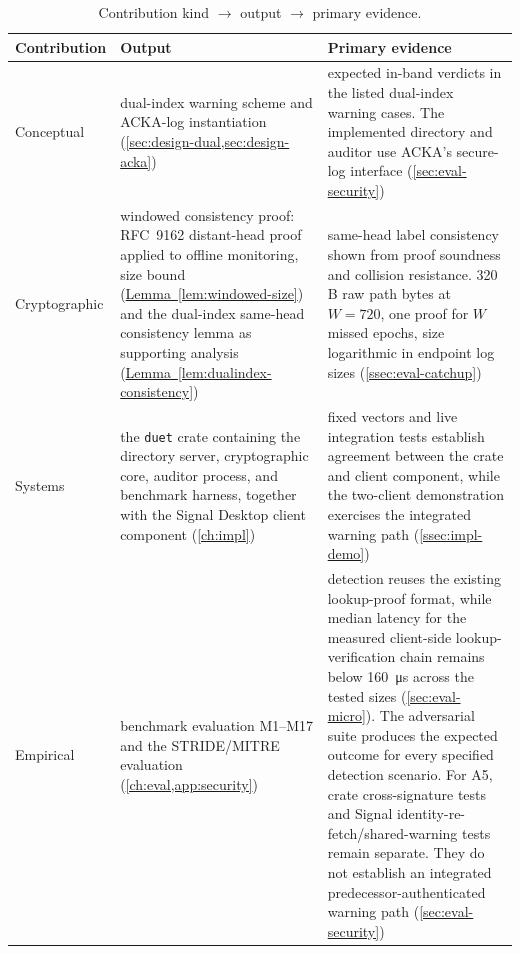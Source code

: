 \begin{table}[ht]
\centering
\caption{Contribution kind $\to$ output $\to$ primary evidence.}
\label{tab:trace-contrib}
\setlength{\extrarowheight}{2pt}
\footnotesize
\begin{tabularx}{\textwidth}{@{}>{\raggedright\arraybackslash}p{2.1cm}>{\raggedright\arraybackslash}X>{\raggedright\arraybackslash}X@{}}
\toprule
Contribution & Output & Primary evidence \\
\midrule
Conceptual & dual-index warning scheme and ACKA-log instantiation (\cref{sec:design-dual,sec:design-acka}) & expected in-band verdicts in the listed dual-index warning cases. The implemented directory and auditor use ACKA's secure-log interface (\cref{sec:eval-security}) \\
Cryptographic & windowed consistency proof: RFC~9162 distant-head proof applied to offline monitoring, size bound (\hyperref[lem:windowed-size]{Lemma~\ref*{lem:windowed-size}}) and the dual-index same-head consistency lemma as supporting analysis (\hyperref[lem:dualindex-consistency]{Lemma~\ref*{lem:dualindex-consistency}}) & same-head label consistency shown from proof soundness and collision resistance. \num{320}\,B raw path bytes at $W{=}720$, one proof for $W$ missed epochs, size logarithmic in endpoint log sizes (\cref{ssec:eval-catchup}) \\
Systems & the \texttt{duet} crate containing the directory server, cryptographic core, auditor
process, and benchmark harness, together with the Signal Desktop client component
(\cref{ch:impl}) & fixed vectors and live integration tests establish agreement between the crate
and client component, while the two-client demonstration exercises the integrated warning path
(\cref{ssec:impl-demo}) \\
Empirical & benchmark evaluation M1--M17 and the STRIDE/MITRE evaluation
(\cref{ch:eval,app:security}) & detection reuses the existing lookup-proof format, while median latency
for the measured client-side lookup-verification chain remains below \SI{160}{\micro\second} across the tested sizes
(\cref{sec:eval-micro}). The adversarial suite produces the expected outcome for every specified
detection scenario. For A5, crate cross-signature tests and Signal identity-re-fetch/shared-warning
tests remain separate. They do not establish an integrated predecessor-authenticated warning path
(\cref{sec:eval-security}) \\
\bottomrule
\end{tabularx}
\end{table}

